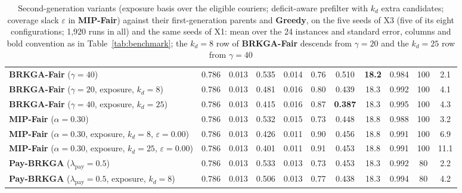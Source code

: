 \documentclass[a4paper,11pt,review,3p,authoryear]{elsarticle}
\begin{document}
\begin{table}
\begin{adjustbox}{max width=\textheight}
\begin{tabular}{l|cc|cc|c|c|c|c|c|c}
\hline
\textbf{BRKGA-Fair} ($\gamma = 40$) & 0.786 & 0.013 & 0.535 & 0.014 & 0.76 & 0.510 & \textbf{18.2} & 0.984 & 100 & 2.1 \\
\textbf{BRKGA-Fair} ($\gamma = 20$, exposure, $k_d = 8$) & 0.786 & 0.013 & 0.481 & 0.016 & 0.80 & 0.439 & 18.3 & 0.992 & 100 & 4.1 \\
\textbf{BRKGA-Fair} ($\gamma = 40$, exposure, $k_d = 25$) & 0.786 & 0.013 & 0.415 & 0.016 & 0.87 & \textbf{0.387} & 18.3 & 0.995 & 100 & 4.3 \\
\textbf{MIP-Fair} ($\alpha = 0.30$) & 0.786 & 0.013 & 0.532 & 0.015 & 0.73 & 0.448 & 18.8 & 0.988 & 100 & 3.2 \\
\textbf{MIP-Fair} ($\alpha = 0.30$, exposure, $k_d = 8$, $\varepsilon = 0.00$) & 0.786 & 0.013 & 0.426 & 0.011 & 0.90 & 0.456 & 18.8 & 0.991 & 100 & 6.9 \\
\textbf{MIP-Fair} ($\alpha = 0.30$, exposure, $k_d = 25$, $\varepsilon = 0.00$) & 0.786 & 0.013 & 0.401 & 0.011 & 0.91 & 0.453 & 18.8 & 0.991 & 100 & 11.1 \\
\textbf{Pay-BRKGA} ($\lambda_{\text{pay}} = 0.5$) & 0.786 & 0.013 & 0.533 & 0.013 & 0.73 & 0.453 & 18.3 & 0.992 & 80 & 2.2 \\
\textbf{Pay-BRKGA} ($\lambda_{\text{pay}} = 0.5$, exposure, $k_d = 8$) & 0.786 & 0.013 & 0.506 & 0.013 & 0.77 & 0.438 & 18.3 & 0.994 & 80 & 4.2 \\
\end{tabular}
\end{adjustbox}
\caption{Second-generation variants (exposure basis over the eligible couriers; deficit-aware prefilter with $k_d$ extra candidates; coverage slack $\varepsilon$ in \textbf{MIP-Fair}) against their first-generation parents and \textbf{Greedy}, on the five seeds of X3 (five of its eight configurations; 1{,}920 runs in all) and the same seeds of X1: mean over the 24 instances and standard error, columns and bold convention as in Table~\ref{tab:benchmark}; the $k_d = 8$ row of \textbf{BRKGA-Fair} descends from $\gamma = 20$ and the $k_d = 25$ row from $\gamma = 40$}
\label{tab:gen2}
\end{table}
\end{document}
